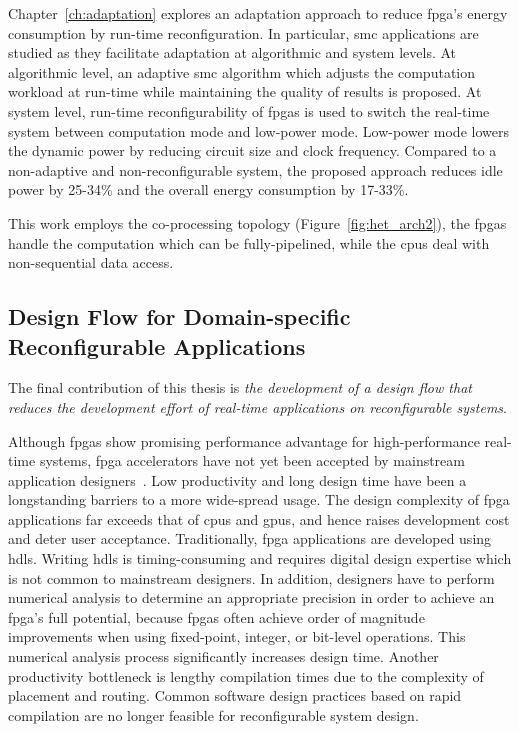 Chapter~\ref{ch:adaptation} explores an adaptation approach to reduce \gls{fpga}'s energy consumption by run-time reconfiguration.
In particular, \gls{smc} applications are studied as they facilitate adaptation at algorithmic and system levels.
At algorithmic level, an adaptive \gls{smc} algorithm which adjusts the computation workload at run-time while maintaining the quality of results is proposed.
At system level, run-time reconfigurability of \glspl{fpga} is used to switch the real-time system between computation mode and low-power mode.
Low-power mode lowers the dynamic power by reducing circuit size and clock frequency.
Compared to a non-adaptive and non-reconfigurable system, the proposed approach reduces idle power by 25-34\% and the overall energy consumption by 17-33\%.

This work employs the co-processing topology (Figure~\ref{fig:het_arch2}), the \glspl{fpga} handle the computation which can be fully-pipelined, while the \glspl{cpu} deal with non-sequential data access.

\subsection{Design Flow for Domain-specific Reconfigurable Applications}

The final contribution of this thesis is \textit{the development of a design flow that reduces the development effort of real-time applications on reconfigurable systems}.

Although \glspl{fpga} show promising performance advantage for high-performance real-time systems, \gls{fpga} accelerators have not yet been accepted by mainstream application designers~\cite{stitt11}.
Low productivity and long design time have been a longstanding barriers to a more wide-spread usage.
The design complexity of \gls{fpga} applications far exceeds that of \glspl{cpu} and \glspl{gpu}, and hence raises development cost and deter user acceptance.
Traditionally, \gls{fpga} applications are developed using \glspl{hdl}.
Writing \glspl{hdl} is timing-consuming and requires digital design expertise which is not common to mainstream designers.
In addition, designers have to perform numerical analysis to determine an appropriate precision in order to achieve an \gls{fpga}'s full potential, because \glspl{fpga} often achieve order of magnitude improvements when using fixed-point, integer, or bit-level operations.
This numerical analysis process significantly increases design time.
Another productivity bottleneck is lengthy compilation times due to the complexity of placement and routing.
Common software design practices based on rapid compilation are no longer feasible for reconfigurable system design.

